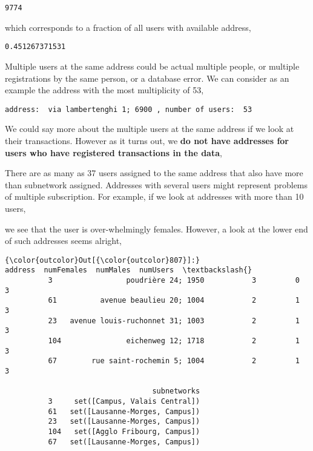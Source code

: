 \documentclass{report}
\begin{document}
    \begin{Verbatim}[commandchars=\\\{\}]
9774
    \end{Verbatim}

    which corresponds to a fraction of all users with available address,


    \begin{Verbatim}[commandchars=\\\{\}]
0.451267371531
    \end{Verbatim}

    Multiple users at the same address could be actual multiple people, or
multiple registrations by the same person, or a database error. We can
consider as an example the address with the most multiplicity of 53,


    \begin{Verbatim}[commandchars=\\\{\}]
address:  via lambertenghi 1; 6900 , number of users:  53
    \end{Verbatim}

    We could say more about the multiple users at the same address if we
look at their transactions. However as it turns out, we \textbf{do not
have addresses for users who have registered transactions in the data},




    There are as many as 37 users assigned to the same address that also
have more than subnetwork assigned. Addresses with several users might
represent problems of multiple subscription. For example, if we look at
addresses with more than 10 users,

    we see that the user is over-whelmingly females. However, a look at the
lower end of such addresses seems alright,


            \begin{Verbatim}[commandchars=\\\{\}]
{\color{outcolor}Out[{\color{outcolor}807}]:}                              address  numFemales  numMales  numUsers  \textbackslash{}
          3                 poudrière 24; 1950           3         0         3   
          61          avenue beaulieu 20; 1004           2         1         3   
          23   avenue louis-ruchonnet 31; 1003           2         1         3   
          104               eichenweg 12; 1718           2         1         3   
          67        rue saint-rochemin 5; 1004           2         1         3   
          
                                  subnetworks  
          3     set([Campus, Valais Central])  
          61   set([Lausanne-Morges, Campus])  
          23   set([Lausanne-Morges, Campus])  
          104   set([Agglo Fribourg, Campus])  
          67   set([Lausanne-Morges, Campus])  
\end{Verbatim}
        
\end{document}
